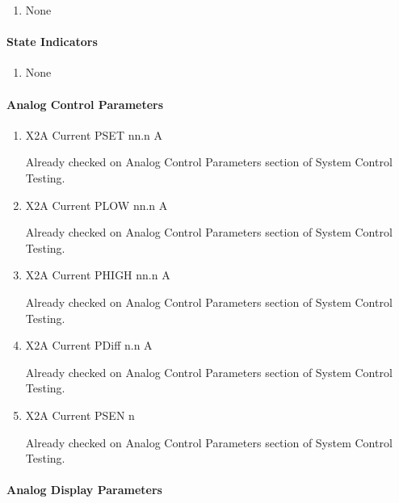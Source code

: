 \documentclass[11pt]{book}		%
\begin{document}
\begin{enumerate}
\item None
\end{enumerate}

\paragraph{State Indicators}

\begin{enumerate}
 \item None
\end{enumerate}

\paragraph{Analog Control Parameters}

\begin{enumerate}
 \item X2A Current PSET   nn.n A

\color{red}
Already checked on Analog Control Parameters section of System Control Testing.
\color{black}

 \item X2A Current PLOW   nn.n A

\color{red}
Already checked on Analog Control Parameters section of System Control Testing.
\color{black}

 \item X2A Current PHIGH  nn.n A

\color{red}
Already checked on Analog Control Parameters section of System Control Testing.
\color{black}

 \item X2A Current PDiff n.n A

\color{red}
Already checked on Analog Control Parameters section of System Control Testing.
\color{black}

 \item X2A Current PSEN  n

\color{red}
Already checked on Analog Control Parameters section of System Control Testing.
\color{black}

\end{enumerate}

\paragraph{Analog Display Parameters}
\end{document}
